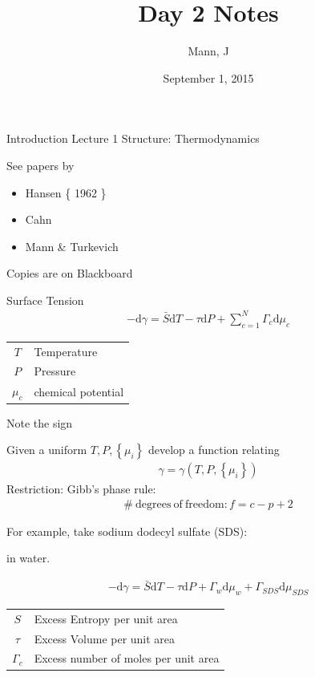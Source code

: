 \documentclass{article}
\author{Mann, J}
\title{Day 2 Notes}
\date{September 1, 2015}
\renewcommand{\d}[0]{\mathrm{d}}
\begin{document}
\maketitle{}
\begin{section}{Introduction}
  Lecture 1 Structure: Thermodynamics

  See papers by 
  \begin{itemize}
    \item Hansen \{ 1962 \}
    \item Cahn
    \item Mann \& Turkevich
  \end{itemize}

  Copies are on Blackboard
\end{section}
\begin{section}{Surface Tension}
  \begin{align*}
    -\d\gamma = \bar{S}\d T - \tau \d P + \sum_{c=1}^{N}\Gamma_c \d \mu_c
  \end{align*}
  \begin{center}
    \begin{tabular}{|c|l|}
      \hline
      $T$ & Temperature\\
      $P$ & Pressure\\
      $\mu_c$ & chemical potential\\
      \hline
    \end{tabular}
  \end{center}
  
  Note the sign

  Given a uniform $T,P,\left\{ \mu_i \right\}$ develop a function relating 
  \begin{align*}
    \gamma=\gamma(T,P,\left\{ \mu_i \right\})
  \end{align*}
  Restriction: Gibb's phase rule:
  \begin{align*}
    \mathrm{\#\ degrees\ of\ freedom}: f = c-p+2
  \end{align*}

  For example, take sodium dodecyl sulfate (SDS):
  
  \begin{center}
  \end{center}
  
  in water.

  \begin{align*}
    -\d\gamma = \bar{S}\d T - \tau \d P + \Gamma_w \d\mu_w + \Gamma_{SDS}\d\mu_{SDS}
  \end{align*}
\begin{center}\begin{tabular}{|c| l|}
    \hline
      $S$ & Excess Entropy per unit area\\
      $\tau$ & Excess Volume per unit area\\
      $\Gamma_c$ & Excess number of moles per unit area\\
      \hline
      \end{tabular}\end{center}


\end{section}
\end{document}
